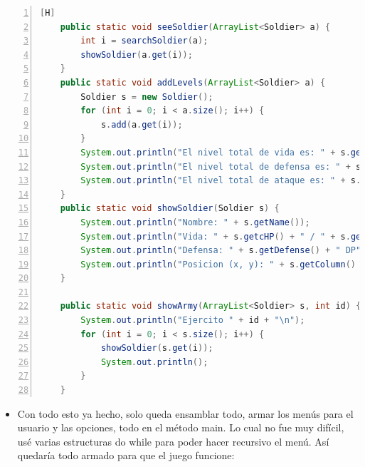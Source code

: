 \documentclass{article}
\begin{document}
	\begin{lstlisting}[language=java,caption={Otros}, numbers=left][H]
	public static void seeSoldier(ArrayList<Soldier> a) {
        int i = searchSoldier(a);
        showSoldier(a.get(i));
    }
    public static void addLevels(ArrayList<Soldier> a) {
        Soldier s = new Soldier();
        for (int i = 0; i < a.size(); i++) {
            s.add(a.get(i));
        }
        System.out.println("El nivel total de vida es: " + s.getMaxHP());
        System.out.println("El nivel total de defensa es: " + s.getDefense());
        System.out.println("El nivel total de ataque es: " + s.getAtk());
    }
    public static void showSoldier(Soldier s) {
        System.out.println("Nombre: " + s.getName());
        System.out.println("Vida: " + s.getcHP() + " / " + s.getMaxHP() + " HP");
        System.out.println("Defensa: " + s.getDefense() + " DP");
        System.out.println("Posicion (x, y): " + s.getColumn() + " - " + s.getRow() + "\n");
    }

    public static void showArmy(ArrayList<Soldier> s, int id) {
        System.out.println("Ejercito " + id + "\n");
        for (int i = 0; i < s.size(); i++) {
            showSoldier(s.get(i));
            System.out.println();
        }
    }
	\end{lstlisting}	
	
	\begin{itemize}
		\item Con todo esto ya hecho, solo queda ensamblar todo, armar los menús para el usuario y las opciones, todo en el método main. Lo cual no fue muy difícil, usé varias estructuras do while para poder hacer recursivo el menú. Así quedaría todo armado para que el juego funcione:
	\end{itemize}
\end{document}
